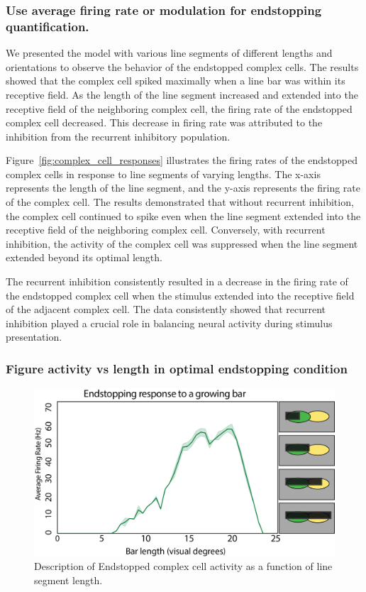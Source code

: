 \documentclass[12pt]{article}
\begin{document}
\bigbreak
\subsubsection{Use average firing rate or modulation for endstopping quantification.}
We presented the model with various line segments of different lengths and orientations to observe the behavior of the endstopped complex cells. The results showed that the complex cell spiked maximally when a line bar was within its receptive field. As the length of the line segment increased and extended into the receptive field of the neighboring complex cell, the firing rate of the endstopped complex cell decreased. This decrease in firing rate was attributed to the inhibition from the recurrent inhibitory population.

Figure~\ref{fig:complex_cell_responses} illustrates the firing rates of the endstopped complex cells in response to line segments of varying lengths. The x-axis represents the length of the line segment, and the y-axis represents the firing rate of the complex cell. The results demonstrated that without recurrent inhibition, the complex cell continued to spike even when the line segment extended into the receptive field of the neighboring complex cell. Conversely, with recurrent inhibition, the activity of the complex cell was suppressed when the line segment extended beyond its optimal length.

The recurrent inhibition consistently resulted in a decrease in the firing rate of the endstopped complex cell when the stimulus extended into the receptive field of the adjacent complex cell. The data consistently showed that recurrent inhibition played a crucial role in balancing neural activity during stimulus presentation.

  \subsubsection{Figure activity vs length in optimal endstopping condition}
  \begin{figure}[H]
    \centering
    \includegraphics[width=1.0 \textwidth]{figures/endstop_line_length.png}
    \caption{Description of Endstopped complex cell activity as a function of line segment length.}
    \label{fig:endstopping_length}
  \end{figure}
\end{document}

